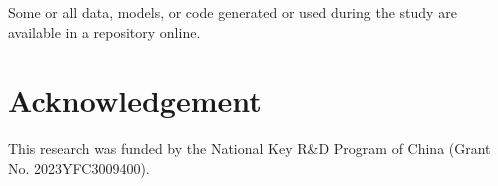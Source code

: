 \documentclass[preprint,11pt,authoryear,3p]{elsarticle}
\begin{document}
Some or all data, models, or code generated or used during the study are available in a repository online.

\section*{Acknowledgement}

This research was funded by the National Key R\&D Program of China (Grant No. 2023YFC3009400).






\end{document}
